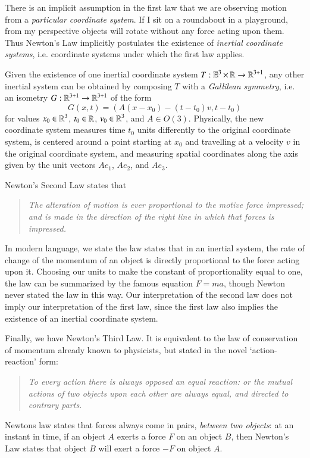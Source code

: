 There is an implicit assumption in the first law that we are observing motion from a \emph{particular coordinate system}. If I sit on a roundabout in a playground, from my perspective objects will rotate without any force acting upon them. Thus Newton's Law implicitly postulates the existence of \emph{inertial coordinate systems}, i.e. coordinate systems under which the first law applies.

Given the existence of one inertial coordinate system $T:\operatorname{\mathbb{E}}^3 \times \operatorname{\mathbb{R}} \to \operatorname{\mathbb{R}}^{3+1}$, any other inertial system can be obtained by composing $T$ with a \emph{Gallilean symmetry}, i.e. an isometry $G: \operatorname{\mathbb{R}}^{3+1} \to \operatorname{\mathbb{R}}^{3+1}$ of the form
%
\[ G(x,t) = ( A(x - x_0) - (t - t_0) v, t - t_0 ) \]
% 
for values $x_0 \in \operatorname{\mathbb{R}}^3$, $t_0 \in \operatorname{\mathbb{R}}$, $v_0 \in \operatorname{\mathbb{R}}^3$, and $A \in O(3)$. Physically, the new coordinate system measures time $t_0$ units differently to the original coordinate system, is centered around a point starting at $x_0$ and travelling at a velocity $v$ in the original coordinate system, and measuring spatial coordinates along the axis given by the unit vectors $Ae_1$, $Ae_2$, and $Ae_3$.

Newton's Second Law states that
%
\begin{quote}
    \emph{The alteration of motion is ever proportional to the motive force impressed; and is made in the direction of the right line in which that forces is impressed.}
\end{quote}
%
In modern language, we state the law states that in an inertial system, the rate of change of the momentum of an object is directly proportional to the force acting upon it. Choosing our units to make the constant of proportionality equal to one, the law can be summarized by the famous equation $F = ma$, though Newton never stated the law in this way. Our interpretation of the second law does not imply our interpretation of the first law, since the first law also implies the existence of an inertial coordinate system.

Finally, we have Newton's Third Law. It is equivalent to the law of conservation of momentum already known to physicists, but stated in the novel `action-reaction' form:
%
\begin{quote}
    \emph{To every action there is always opposed an equal reaction: or the mutual actions of two objects upon each other are always equal, and directed to contrary parts}.
\end{quote}
%
Newtons law states that forces always come in pairs, \emph{between two objects}: at an instant in time, if an object $A$ exerts a force $F$ on an object $B$, then Newton's Law states that object $B$ will exert a force $-F$ on object $A$.

